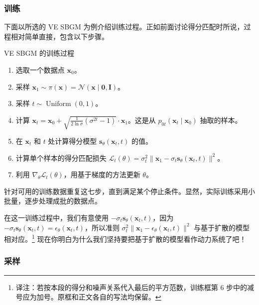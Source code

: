 \subsubsection{训练}

下面以所选的 VE SBGM 为例介绍训练过程。正如前面讨论得分匹配时所说，过程相对简单直接，包含以下步骤。
\begin{booknote}[colframe=blue!65!black,colback=blue!4]{VE SBGM 的训练过程}
  \begin{enumerate}
    \item 选取一个数据点 $\mathbf x_0$。
    \item 采样 $\mathbf x_1\sim\pi(\mathbf x)=\mathcal N(\mathbf x\mid\mathbf 0,\mathbf I)$。
    \item 采样 $t\sim\operatorname{Uniform}(0,1)$。
    \item 计算 $\mathbf x_t=\mathbf x_0+\sqrt{\frac{1}{2\ln\sigma}(\sigma^{2t}-1)}\cdot\mathbf x_1$。这是从 $p_{0t}(\mathbf x_t\mid\mathbf x_0)$ 抽取的样本。
    \item 在 $\mathbf x_t$ 和 $t$ 处计算得分模型 $\mathbf s_\theta(\mathbf x_t,t)$ 的值。
    \item 计算单个样本的得分匹配损失 $\mathcal L_t(\theta)=\sigma_t^2\lVert\mathbf x_1-\sigma_t\mathbf s_\theta(\mathbf x_t,t)\rVert^2$。
    \item 利用 $\nabla_\theta\mathcal L_t(\theta)$，用基于梯度的方法更新 $\theta$。
  \end{enumerate}
\end{booknote}
针对可用的训练数据重复这七步，直到满足某个停止条件。显然，实际训练采用小批量，逐步处理成批的数据点。

在这一训练过程中，我们有意使用 $-\sigma_t\mathbf s_\theta(\mathbf x_t,t)$，因为 $-\sigma_t\mathbf s_\theta(\mathbf x_t,t)=\epsilon_\theta(\mathbf x_t,t)$，所以准则 $\sigma_t^2\lVert\mathbf x_1-\epsilon_\theta(\mathbf x_t,t)\rVert^2$ 与基于扩散的模型相对应。\footnote{译注：若按本段的得分和噪声关系代入最后的平方范数，训练框第 6 步中的减号应为加号。原框和正文各自的写法均保留。} 现在你明白为什么我们坚持要把基于扩散的模型看作动力系统了吧！

\subsubsection{采样}

